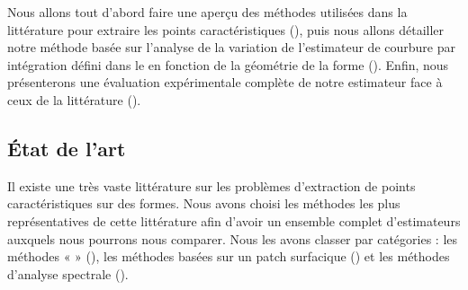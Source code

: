 %
%
%
%
%


Nous allons tout d'abord faire une aperçu des méthodes utilisées dans la
littérature pour extraire les points caractéristiques
(), puis nous allons détailler notre
méthode basée sur l'analyse de la variation de l'estimateur de courbure par
intégration défini dans le  en fonction de la
géométrie de la forme (). Enfin, nous
présenterons une évaluation expérimentale complète de notre estimateur face à
ceux de la littérature ().
%
\subsection{État de l'art}%
\label{sec:applications:feature:SOTA}
%
Il existe une très vaste littérature sur les problèmes d'extraction de points
caractéristiques sur des formes. Nous avons choisi les méthodes les plus
représentatives de cette littérature afin d'avoir un ensemble complet
d'estimateurs auxquels nous pourrons nous comparer. Nous les avons classer par
catégories : les méthodes «  »
(), les méthodes basées sur un patch
surfacique () et les méthodes
d'analyse spectrale ().
%
